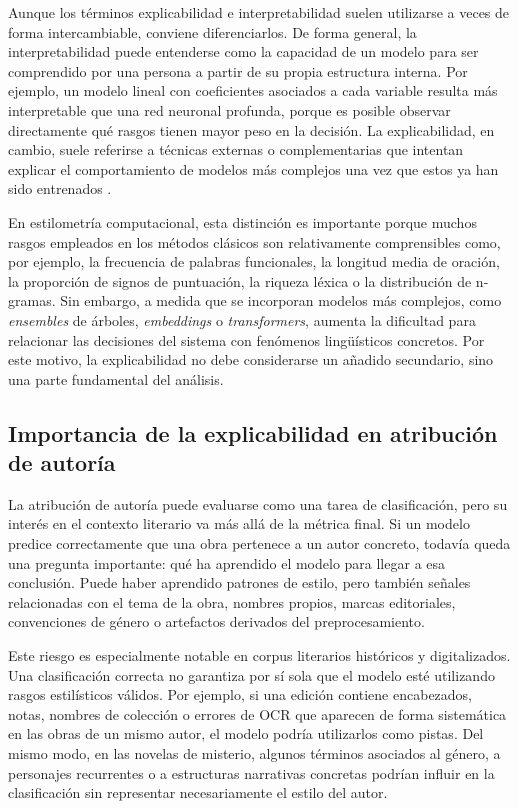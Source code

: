 \documentclass[IB]{TFUOC}%
\begin{document}
Aunque los términos explicabilidad e interpretabilidad suelen utilizarse a veces de forma intercambiable, conviene diferenciarlos. De forma general, la interpretabilidad puede entenderse como la capacidad de un modelo para ser comprendido por una persona a partir de su propia estructura interna. Por ejemplo, un modelo lineal con coeficientes asociados a cada variable resulta más interpretable que una red neuronal profunda, porque es posible observar directamente qué rasgos tienen mayor peso en la decisión. La explicabilidad, en cambio, suele referirse a técnicas externas o complementarias que intentan explicar el comportamiento de modelos más complejos una vez que estos ya han sido entrenados \cite{lipton2018mythos,doshi2017towards}.

En estilometría computacional, esta distinción es importante porque muchos rasgos empleados en los métodos clásicos son relativamente comprensibles como, por ejemplo, la frecuencia de palabras funcionales, la longitud media de oración, la proporción de signos de puntuación, la riqueza léxica o la distribución de n-gramas. Sin embargo, a medida que se incorporan modelos más complejos, como \textit{ensembles} de árboles, \textit{embeddings} o \textit{transformers}, aumenta la dificultad para relacionar las decisiones del sistema con fenómenos lingüísticos concretos. Por este motivo, la explicabilidad no debe considerarse un añadido secundario, sino una parte fundamental del análisis.

\subsection{Importancia de la explicabilidad en atribución de autoría}

La atribución de autoría puede evaluarse como una tarea de clasificación, pero su interés en el contexto literario va más allá de la métrica final. Si un modelo predice correctamente que una obra pertenece a un autor concreto, todavía queda una pregunta importante: qué ha aprendido el modelo para llegar a esa conclusión. Puede haber aprendido patrones de estilo, pero también señales relacionadas con el tema de la obra, nombres propios, marcas editoriales, convenciones de género o artefactos derivados del preprocesamiento.

Este riesgo es especialmente notable en corpus literarios históricos y digitalizados. Una clasificación correcta no garantiza por sí sola que el modelo esté utilizando rasgos estilísticos válidos. Por ejemplo, si una edición contiene encabezados, notas, nombres de colección o errores de OCR que aparecen de forma sistemática en las obras de un mismo autor, el modelo podría utilizarlos como pistas. Del mismo modo, en las novelas de misterio, algunos términos asociados al género, a personajes recurrentes o a estructuras narrativas concretas podrían influir en la clasificación sin representar necesariamente el estilo del autor.
\end{document}

